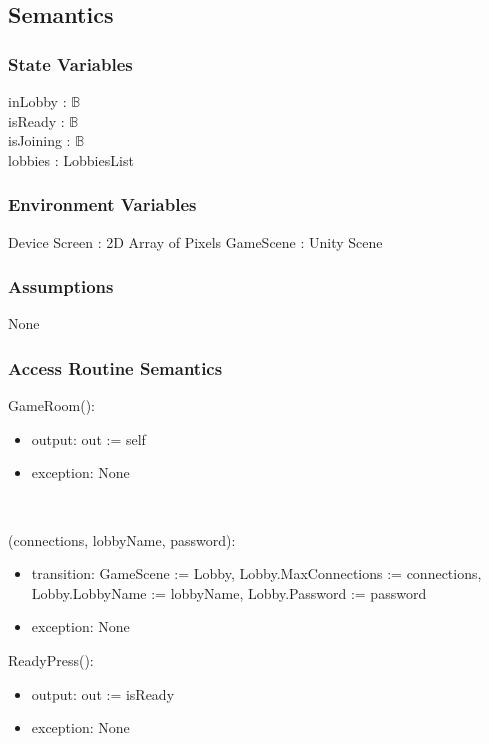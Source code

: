 \documentclass[12pt, titlepage]{article}
\begin{document}
\subsection{Semantics}

\subsubsection{State Variables}

inLobby : $\mathbb{B}$\\
isReady : $\mathbb{B}$\\
isJoining : $\mathbb{B}$\\
lobbies : LobbiesList

\subsubsection{Environment Variables}

Device Screen : 2D Array of Pixels
GameScene : Unity Scene

\subsubsection{Assumptions}

None

\subsubsection{Access Routine Semantics}

\noindent GameRoom():
\begin{itemize}
\item output: out := self
\item exception: None
\end{itemize}\

(connections, lobbyName, password):
\begin{itemize}
\item transition: GameScene := Lobby, Lobby.MaxConnections := connections, Lobby.LobbyName := lobbyName, Lobby.Password := password
\item exception: None
\end{itemize}

\noindent ReadyPress():
\begin{itemize}
\item output: out := isReady
\item exception: None
\end{itemize}\
\end{document}
